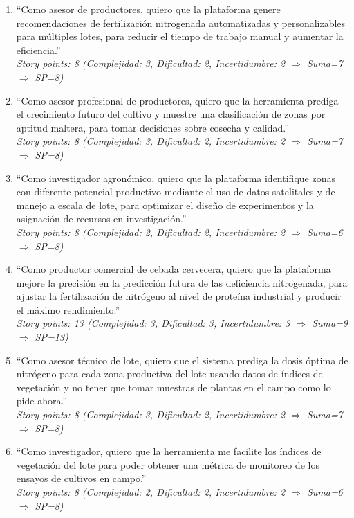 \documentclass[
11pt, %
]{charter}
\begin{document}
\begin{enumerate}
    \item “Como asesor de productores, quiero que la plataforma genere recomendaciones de fertilización nitrogenada automatizadas y personalizables para múltiples lotes, para reducir el tiempo de trabajo manual y aumentar la eficiencia.”\\
    \textit{Story points: 8 (Complejidad: 3, Dificultad: 2, Incertidumbre: 2 $\Rightarrow$ Suma=7 $\Rightarrow$ SP=8)}

    \item “Como asesor profesional de productores, quiero que la herramienta prediga el crecimiento futuro del cultivo y muestre una clasificación de zonas por aptitud maltera, para tomar decisiones sobre cosecha y calidad.”\\ 
    \textit{Story points: 8 (Complejidad: 3, Dificultad: 2, Incertidumbre: 2 $\Rightarrow$ Suma=7 $\Rightarrow$ SP=8)}

    \item “Como investigador agronómico, quiero que la plataforma identifique zonas con diferente potencial productivo mediante el uso de datos satelitales y de manejo a escala de lote, para optimizar el diseño de experimentos y la asignación de recursos en investigación.”\\ 
    \textit{Story points: 8 (Complejidad: 2, Dificultad: 2, Incertidumbre: 2 $\Rightarrow$ Suma=6 $\Rightarrow$ SP=8)}

    \item “Como productor comercial de cebada cervecera, quiero que la plataforma mejore la precisión en la predicción futura de las deficiencia nitrogenada, para ajustar la fertilización de nitrógeno al nivel de proteína industrial y producir el máximo rendimiento.”\\ %
    \textit{Story points: 13 (Complejidad: 3, Dificultad: 3, Incertidumbre: 3 $\Rightarrow$ Suma=9 $\Rightarrow$ SP=13)}

    \item “Como asesor técnico de lote, quiero que el sistema prediga la dosis óptima de nitrógeno para cada zona productiva del lote usando datos de índices de vegetación y no tener que tomar muestras de plantas en el campo como lo pide ahora.”\\
    \textit{Story points: 8 (Complejidad: 3, Dificultad: 2, Incertidumbre: 2 $\Rightarrow$ Suma=7 $\Rightarrow$ SP=8)}

    \item “Como investigador, quiero que la herramienta me facilite los índices de vegetación del lote para poder obtener una métrica de monitoreo de los ensayos de cultivos en campo.”\\ 
    \textit{Story points: 8 (Complejidad: 2, Dificultad: 2, Incertidumbre: 2 $\Rightarrow$ Suma=6 $\Rightarrow$ SP=8)}


\end{enumerate}
\end{document}
